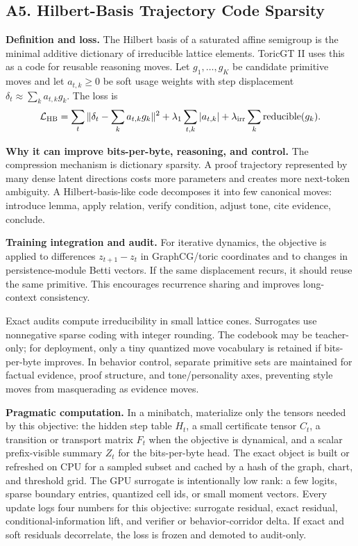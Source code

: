 \documentclass[10pt]{article}
\newcommand{\loss}{\mathcal{L}}
\numberwithin{equation}{section}
\begin{document}
\subsection{A5. Hilbert-Basis Trajectory Code Sparsity}
\noindent\textbf{Definition and loss.} The Hilbert basis of a saturated affine semigroup is the minimal additive dictionary of irreducible lattice elements. ToricGT II uses this as a code for reusable reasoning moves. Let $g_1,\ldots,g_K$ be candidate primitive moves and let $a_{t,k}\ge0$ be soft usage weights with step displacement $\delta_t\approx\sum_k a_{t,k}g_k$. The loss is
\[
\loss_{\rm HB}=\sum_t\|\delta_t-\sum_k a_{t,k}g_k\|^2+\lambda_1\sum_{t,k}|a_{t,k}|+\lambda_{\rm irr}\sum_k \mathrm{reducible}(g_k).
\]

\noindent\textbf{Why it can improve bits-per-byte, reasoning, and control.} The compression mechanism is dictionary sparsity. A proof trajectory represented by many dense latent directions costs more parameters and creates more next-token ambiguity. A Hilbert-basis-like code decomposes it into few canonical moves: introduce lemma, apply relation, verify condition, adjust tone, cite evidence, conclude.

\noindent\textbf{Training integration and audit.} For iterative dynamics, the objective is applied to differences $z_{t+1}-z_t$ in GraphCG/toric coordinates and to changes in persistence-module Betti vectors. If the same displacement recurs, it should reuse the same primitive. This encourages recurrence sharing and improves long-context consistency.

Exact audits compute irreducibility in small lattice cones. Surrogates use nonnegative sparse coding with integer rounding. The codebook may be teacher-only; for deployment, only a tiny quantized move vocabulary is retained if bits-per-byte improves. In behavior control, separate primitive sets are maintained for factual evidence, proof structure, and tone/personality axes, preventing style moves from masquerading as evidence moves.

\noindent\textbf{Pragmatic computation.} In a minibatch, materialize only the tensors needed by this objective: the hidden step table $H_t$, a small certificate tensor $C_t$, a transition or transport matrix $F_t$ when the objective is dynamical, and a scalar prefix-visible summary $Z_t$ for the bits-per-byte head. The exact object is built or refreshed on CPU for a sampled subset and cached by a hash of the graph, chart, and threshold grid. The GPU surrogate is intentionally low rank: a few logits, sparse boundary entries, quantized cell ids, or small moment vectors. Every update logs four numbers for this objective: surrogate residual, exact residual, conditional-information lift, and verifier or behavior-corridor delta. If exact and soft residuals decorrelate, the loss is frozen and demoted to audit-only.
\end{document}
